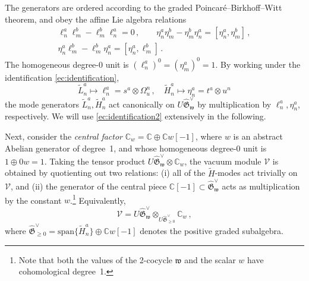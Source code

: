 \documentclass[11pt]{amsart}
\newcommand{\tL}{{\tilde L}}
\newcommand{\tH}{{\tilde H}}
\newcommand{\fG}{\mathfrak{G}}
\numberwithin{equation}{section}
\numberwithin{figure}{section}
\numberwithin{table}{section}
\theoremstyle{thm}
\numberwithin{equation}{subsection}
\theoremstyle{definition}
\theoremstyle{rem}
\begin{document}
The generators are ordered according to the graded Poincaré–Birkhoff–Witt theorem, and obey the affine Lie algebra relations 
\begin{gather*}
    \ell^a_n\ell^b_m - \ell^b_m\ell^a_n = 0\,, 
    \qquad 
    \eta^a_n\eta^b_m - \eta^b_m\eta^a_n = [\eta^a_n,\eta^b_m]\,,\\[4pt]
    \eta^a_n\ell^b_m - \ell^b_m\eta^a_n = [\eta^a_n,\ell^b_m]\,.
\end{gather*}
The homogeneous degree-0 unit is $(\ell^a_n)^0 = (\eta^a_m)^0 = 1$. By working under the identification \eqref{ec:identification},
\begin{equation}
\label{ec:identification2}
    \tL_n^a \mapsto \ell^a_n = s^a \otimes \Omega_u^n \,,\quad \tH_n^a \mapsto\eta^a_n= t^a\otimes u^n
\end{equation}
the mode generators $\tL^a_n,\tH^a_n$ act canonically on $U\widehat{\fG}_\mathfrak{w}^\vee$ by multiplication by $\ell^a_n,\eta^a_n$, respectively. We will use \eqref{ec:identification2} extensively in the following.

Next, consider the \textit{central factor} $\mathbb{C}_w = \mathbb{C} \oplus \mathbb{C}w[-1]$, where $w$ is an abstract Abelian generator of degree~1, and whose homogeneous degree-0 unit is $1 \oplus 0w = 1$.  
Taking the tensor product $U\widehat{\mathfrak{G}}^\vee_{\mathfrak{w}} \otimes \mathbb{C}_w$, the vacuum module $\mathcal{V}$ is obtained by quotienting out two relations:  
(i) all of the $\tH$-modes act trivially on $\mathcal{V}$, and  
(ii) the generator of the central piece $\mathbb{C}[-1] \subset \widehat{\mathfrak{G}}^\vee_{\mathfrak{w}}$ acts as multiplication by the constant $w$.\footnote{Note that both the values of the 2-cocycle $\mathfrak{w}$ and the scalar $w$ have cohomological degree~1.}  
Equivalently,
\begin{equation}
\label{ec:vacummodule}
   \mathcal{V} = U\widehat{\mathfrak{G}}^\vee_{\mathfrak{w}} \otimes_{U\widehat{\mathfrak{G}}^\vee_{\geq 0}} \mathbb{C}_w\,, 
\end{equation}
where $\widehat{\mathfrak{G}}^\vee_{\geq 0} = \mathrm{span}\{\tH_n^a\} \oplus \mathbb{C}w[-1]$ denotes the positive graded subalgebra.


\end{document}

